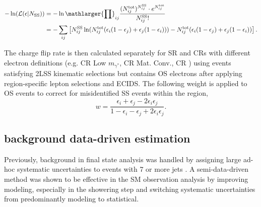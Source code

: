 \documentclass[../thesis.tex]{subfiles}
\begin{document}
\begin{equation}
\begin{aligned}
-\ln (\mathcal{L}(\epsilon | N_\mathrm{SS})) 
&= -\ln \mathlarger{\prod}_{ij} \frac{(N_{ij}^\mathrm{tot})^{N_{ij}^\mathrm{SS}} \cdot e^{N_{ij}^\mathrm{tot}}}{N_{ij}^\mathrm{SS}!} \\
&= -\sum_{ij} \left[
N_{ij}^\mathrm{SS} \ln (
N_{ij}^\mathrm{tot}( \epsilon_i(1-\epsilon_j)+\epsilon_j(1-\epsilon_i) )) - 
N_{ij}^\mathrm{tot}( \epsilon_i(1-\epsilon_j)+\epsilon_j(1-\epsilon_i) ) \right].
\end{aligned}
\end{equation}

The charge flip rate is then calculated separately for \acs{SR} and \acs{CR}s with different electron definitions (e.g. \acs{CR} Low $m_{\gamma^{*}}$, \acs{CR} Mat. Conv., \acs{CR} \ttWpm) using events satisfying 2LSS kinematic selections but contains OS electrons after applying region-specific lepton selections and \acs{ECIDS}. The following weight is applied to \acs{OS} events to correct for misidentified \acs{SS} events within the region,
\begin{equation}
w = \frac{\epsilon_i+\epsilon_j-2\epsilon_i\epsilon_j}{1-\epsilon_i-\epsilon_j+2\epsilon_i\epsilon_j}.
\end{equation}



\subsection{\ttW background data-driven estimation}
\label{sec:ttW_BG}
Previously, \ttW background in \tttt final state analysis was handled by assigning large ad-hoc systematic uncertainties to \ttW events with 7 or more jets \citep{tttt_evidence}. A semi-data-driven method \citep{ana:r_par_susy_2021} was shown to be effective in the SM \tttt observation analysis \citep{tttt_obs} by improving \ttW modeling, especially in the showering step and switching \ttW systematic uncertainties from predominantly modeling to statistical.
\end{document}
